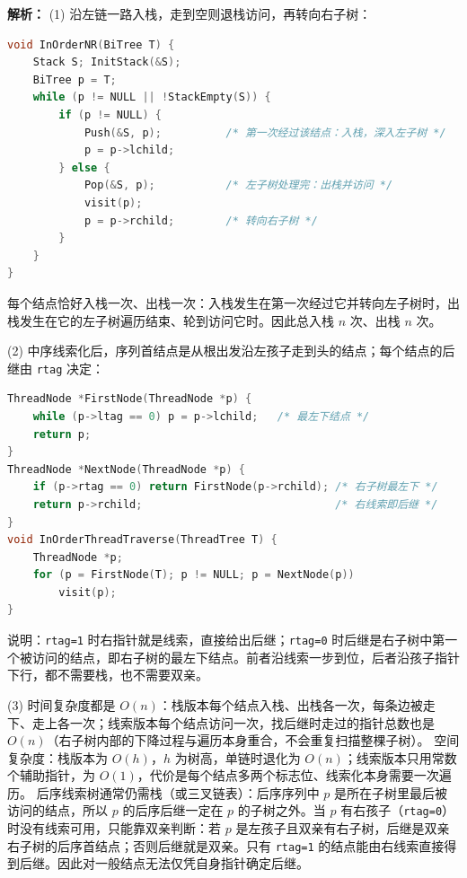 \begin{enumerate}[resume]
\ifshowsolutions\par\noindent\textbf{解析：}
(1) 沿左链一路入栈，走到空则退栈访问，再转向右子树：
\begin{lstlisting}[language=C]
void InOrderNR(BiTree T) {
    Stack S; InitStack(&S);
    BiTree p = T;
    while (p != NULL || !StackEmpty(S)) {
        if (p != NULL) {
            Push(&S, p);          /* 第一次经过该结点：入栈，深入左子树 */
            p = p->lchild;
        } else {
            Pop(&S, p);           /* 左子树处理完：出栈并访问 */
            visit(p);
            p = p->rchild;        /* 转向右子树 */
        }
    }
}
\end{lstlisting}
每个结点恰好入栈一次、出栈一次：入栈发生在第一次经过它并转向左子树时，出栈发生在它的左子树遍历结束、轮到访问它时。因此总入栈 $n$ 次、出栈 $n$ 次。

(2) 中序线索化后，序列首结点是从根出发沿左孩子走到头的结点；每个结点的后继由 \texttt{rtag} 决定：
\begin{lstlisting}[language=C]
ThreadNode *FirstNode(ThreadNode *p) {
    while (p->ltag == 0) p = p->lchild;   /* 最左下结点 */
    return p;
}
ThreadNode *NextNode(ThreadNode *p) {
    if (p->rtag == 0) return FirstNode(p->rchild); /* 右子树最左下 */
    return p->rchild;                              /* 右线索即后继 */
}
void InOrderThreadTraverse(ThreadTree T) {
    ThreadNode *p;
    for (p = FirstNode(T); p != NULL; p = NextNode(p))
        visit(p);
}
\end{lstlisting}

说明：\texttt{rtag=1} 时右指针就是线索，直接给出后继；\texttt{rtag=0} 时后继是右子树中第一个被访问的结点，即右子树的最左下结点。前者沿线索一步到位，后者沿孩子指针下行，都不需要栈，也不需要双亲。

(3) 时间复杂度都是 $O(n)$：栈版本每个结点入栈、出栈各一次，每条边被走下、走上各一次；线索版本每个结点访问一次，找后继时走过的指针总数也是 $O(n)$（右子树内部的下降过程与遍历本身重合，不会重复扫描整棵子树）。
空间复杂度：栈版本为 $O(h)$，$h$ 为树高，单链时退化为 $O(n)$；线索版本只用常数个辅助指针，为 $O(1)$，代价是每个结点多两个标志位、线索化本身需要一次遍历。
后序线索树通常仍需栈（或三叉链表）：后序序列中 $p$ 是所在子树里最后被访问的结点，所以 $p$ 的后序后继一定在 $p$ 的子树之外。当 $p$ 有右孩子（\texttt{rtag=0}）时没有线索可用，只能靠双亲判断：若 $p$ 是左孩子且双亲有右子树，后继是双亲右子树的后序首结点；否则后继就是双亲。只有 \texttt{rtag=1} 的结点能由右线索直接得到后继。因此对一般结点无法仅凭自身指针确定后继。

\else \answerarea[10] \fi

\end{enumerate}

\vspace{8pt}

